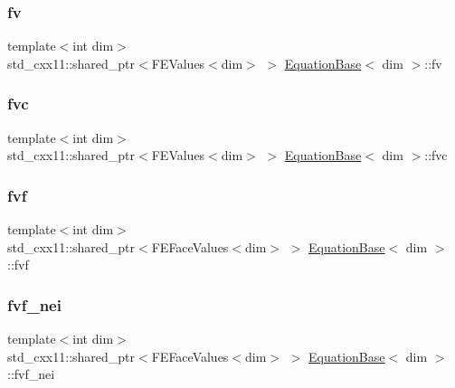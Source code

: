 \mbox{\label{class_equation_base_abf3c19880eaea0911fff9eb7f3b4b425}} 
\subsubsection{\texorpdfstring{fv}{fv}}
{\footnotesize\ttfamily template$<$int dim$>$ \\
std\+\_\+cxx11\+::shared\+\_\+ptr$<$F\+E\+Values$<$dim$>$ $>$ \hyperlink{class_equation_base}{Equation\+Base}$<$ dim $>$\+::fv\hspace{0.3cm}{\ttfamily [protected]}}

\mbox{\label{class_equation_base_a04c2626e352fcc6b1c24c50a7e899c2f}} 
\subsubsection{\texorpdfstring{fvc}{fvc}}
{\footnotesize\ttfamily template$<$int dim$>$ \\
std\+\_\+cxx11\+::shared\+\_\+ptr$<$F\+E\+Values$<$dim$>$ $>$ \hyperlink{class_equation_base}{Equation\+Base}$<$ dim $>$\+::fvc\hspace{0.3cm}{\ttfamily [protected]}}

\mbox{\label{class_equation_base_a80b624dc27281e2758918d83fd38daf4}} 
\subsubsection{\texorpdfstring{fvf}{fvf}}
{\footnotesize\ttfamily template$<$int dim$>$ \\
std\+\_\+cxx11\+::shared\+\_\+ptr$<$F\+E\+Face\+Values$<$dim$>$ $>$ \hyperlink{class_equation_base}{Equation\+Base}$<$ dim $>$\+::fvf\hspace{0.3cm}{\ttfamily [protected]}}

\mbox{\label{class_equation_base_abd53ef2bf719d3f8e72881072383180c}} 
\subsubsection{\texorpdfstring{fvf\+\_\+nei}{fvf\_nei}}
{\footnotesize\ttfamily template$<$int dim$>$ \\
std\+\_\+cxx11\+::shared\+\_\+ptr$<$F\+E\+Face\+Values$<$dim$>$ $>$ \hyperlink{class_equation_base}{Equation\+Base}$<$ dim $>$\+::fvf\+\_\+nei\hspace{0.3cm}{\ttfamily [protected]}}

